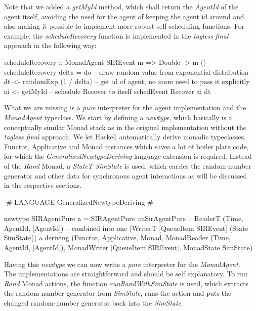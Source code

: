 Note that we added a \textit{getMyId} method, which shall return the \textit{AgentId} of the agent itself, avoiding the need for the agent of keeping the agent id around and also making it possible to implement more robust self-scheduling functions. For example, the \textit{scheduleRecovery} function is implemented in the \textit{tagless final} approach in the following way:

\begin{HaskellCode}
scheduleRecovery :: MonadAgent SIREvent m => Double -> m ()
scheduleRecovery delta = do
  -- draw random value from exponential distribution
  dt <- randomExp (1 / delta)
  -- get id of agent, no more need to pass it explicitly
  ai <- getMyId
  -- schedule Recover to itself
  schedEvent Recover ai dt
\end{HaskellCode}

What we are missing is a \textit{pure} interpreter for the agent implementation and the \textit{MonadAgent} typeclass. We start by defining a \textit{newtype}, which basically is a conceptually similar Monad stack as in the original implementation without the \textit{tagless final} approach. We let Haskell automatically derive monadic typeclasses, Functor, Applicative and Monad instances which saves a lot of boiler plate code, for which the \textit{GeneralizedNewtypeDeriving} language extension is required. Instead of the \textit{Rand} Monad, a \textit{StateT SimState} is used, which carries the random-number generator and other data  for synchronous agent interactions as will be discussed in the respective sections.

\begin{HaskellCode}
{-# LANGUAGE GeneralizedNewtypeDeriving #-}

newtype SIRAgentPure a = SIRAgentPure 
  { unSirAgentPure :: ReaderT (Time, AgentId, [AgentId]) -- combined into one
                        (WriterT [QueueItem SIREvent]
                          (State SimState)) a}
  deriving (Functor, Applicative, Monad, 
            MonadReader (Time, AgentId, [AgentId]),
            MonadWriter [QueueItem SIREvent],  
            MonadState SimState)
\end{HaskellCode}

Having this \textit{newtype} we can now write a \textit{pure} interpreter for the \textit{MonadAgent}. The implementations are straightforward and should be self explanatory. To run \textit{Rand} Monad actions, the function \textit{runRandWithSimState} is used, which extracts the random-number generator from \textit{SimState}, runs the action and puts the changed random-number generator back into the \textit{SimState}.

